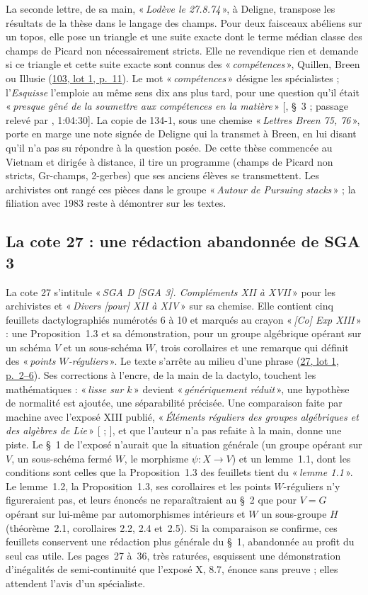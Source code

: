 \documentclass[11pt]{amsart}
\makeatletter
\newcommand{\ts}[1]{\foreignlanguage{english}{#1}}
\newcommand{\q}[1]{«\,\textit{#1}\,»}
\def\RHM@first#1--#2\@nil{#1}
\DeclareRobustCommand{\lot}[3]{\begingroup\edef\RHM@pdfpage{\the\numexpr\RHM@first#3--\@nil+1\relax}\href{https://grothendieck.umontpellier.fr/#1.pdf\#page=\RHM@pdfpage}{#1, lot #2, p.~#3}\endgroup}
\newcommand{\lot}[3]{\href{https://grothendieck.commutator.io/\##1/#2/p#3}{#1, lot #2, p.~#3}}
\makeatother
\begin{document}
La seconde lettre, de sa main, \q{Lodève le 27.8.74}, à Deligne, transpose les résultats de la thèse dans le langage des champs. Pour deux faisceaux abéliens sur un topos, elle pose un triangle et une suite exacte dont le terme médian classe des champs de Picard non nécessairement stricts. Elle ne revendique rien et demande si ce triangle et cette suite exacte sont connus des \q{compétences}, Quillen, Breen ou Illusie (\lot{103}{1}{11}). Le mot \q{compétences} désigne les spécialistes ; l'\emph{Esquisse} l'emploie au même sens dix ans plus tard, pour une question qu'il était \q{presque gêné de la soumettre aux compétences en la matière} [\citealp{grothendieck1997}, §~3 ; passage relevé par \citealp{toen2025}, \ts{1:04:30}]. La copie de 134-1, sous une chemise \q{Lettres Breen 75, 76}, porte en marge une note signée de Deligne qui la transmet à Breen, en lui disant qu'il n'a pas su répondre à la question posée. De cette thèse commencée au Vietnam et dirigée à distance, il tire un programme (champs de Picard non stricts, Gr-champs, 2-gerbes) que ses anciens élèves se transmettent. Les archivistes ont rangé ces pièces dans le groupe \q{Autour de \emph{Pursuing stacks}} ; la filiation avec 1983 reste à démontrer sur les textes.

\subsection{La cote 27 : une rédaction abandonnée de SGA 3}

La cote 27 s'intitule \q{SGA D [SGA 3]. Compléments XII à XVII} pour les archivistes et \q{Divers [pour] XII à XIV} sur sa chemise. Elle contient cinq feuillets dactylographiés numérotés 6 à 10 et marqués au crayon \q{[Co] Exp XIII} : une Proposition~1.3 et sa démonstration, pour un groupe algébrique opérant sur un schéma $V$ et un sous-schéma $W$, trois corollaires et une remarque qui définit des \q{points $W$-réguliers}. Le texte s'arrête au milieu d'une phrase (\lot{27}{1}{2--6}). Ses corrections à l'encre, de la main de la dactylo, touchent les mathématiques : \q{lisse sur $k$} devient \q{génériquement réduit}, une hypothèse de normalité est ajoutée, une séparabilité précisée. Une comparaison faite par machine avec l'exposé XIII publié, \q{Éléments réguliers des groupes algébriques et des algèbres de Lie} [\citealp{sga3} ; \citealp{sga3xiii}], et que l'auteur n'a pas refaite à la main, donne une piste. Le §~1 de l'exposé n'aurait que la situation générale (un groupe opérant sur $V$, un sous-schéma fermé $W$, le morphisme $\psi : X \to V$) et un lemme~1.1, dont les conditions sont celles que la Proposition~1.3 des feuillets tient du \q{lemme 1.1}. Le lemme~1.2, la Proposition~1.3, ses corollaires et les points $W$-réguliers n'y figureraient pas, et leurs énoncés ne reparaîtraient au §~2 que pour $V = G$ opérant sur lui-même par automorphismes intérieurs et $W$ un sous-groupe $H$ (théorème~2.1, corollaires 2.2, 2.4 et~2.5). Si la comparaison se confirme, ces feuillets conservent une rédaction plus générale du §~1, abandonnée au profit du seul cas utile. Les pages~27 à~36, très raturées, esquissent une démonstration d'inégalités de semi-continuité que l'exposé X, 8.7, énonce sans preuve ; elles attendent l'avis d'un spécialiste.
\end{document}

